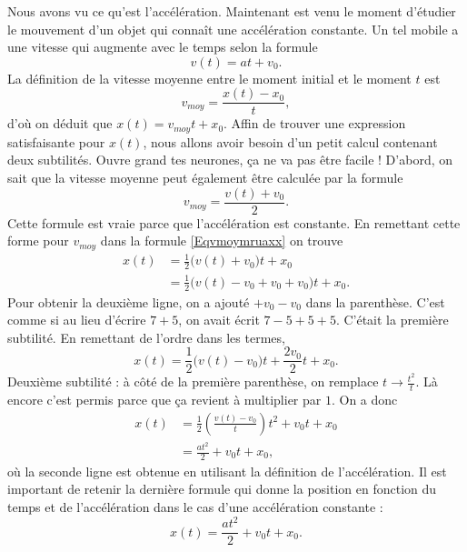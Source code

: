 \documentclass[a4paper,12pt]{book}
\theoremstyle{mes_exemples}	\newtheorem{exemple}[numtho]{Exemple}
\theoremstyle{mes_tho}
\begin{document}
Nous avons vu ce qu'est l'accélération. Maintenant est venu le moment d'étudier le mouvement d'un objet qui connaît une accélération constante. Un tel mobile a une vitesse qui augmente avec le temps selon la formule
\[ 
  v(t)=at+v_0.
\]
La définition de la vitesse moyenne entre le moment initial et le moment $t$ est 
\begin{equation}		\label{Eqvmoymruaxx}
v_{moy}=\frac{ x(t)-x_0 }{ t },
\end{equation}
d'où on déduit que $x(t)=v_{moy}t+x_0$. Affin de trouver une expression satisfaisante pour $x(t)$, nous allons avoir besoin d'un petit calcul contenant deux subtilités. Ouvre grand tes neurones, ça ne va pas être facile ! D'abord, on sait que la vitesse moyenne peut également être calculée par la formule
\[ 
  v_{moy}=\frac{ v(t)+v_0 }{ 2 }.
\]
Cette formule est vraie parce que l'accélération est constante. En remettant cette forme pour $v_{moy}$ dans la formule \eqref{Eqvmoymruaxx} on trouve
 \begin{equation}
\begin{split}
  x(t)&=\frac{ 1 }{2}\big( v(t)+v_0 \big)t+x_0\\
	&=\frac{ 1 }{2}\big( v(t)-v_0+v_0+v_0 \big)t+x_0.
\end{split}
\end{equation}
Pour obtenir la deuxième ligne, on a ajouté $+v_0-v_0$ dans la parenthèse. C'est comme si au lieu d'écrire $7+5$, on avait écrit $7-5+5+5$. C'était la première subtilité. En remettant de l'ordre dans les termes,
\[ 
  x(t)=\frac{ 1 }{2}\big( v(t)-v_0 \big)t+\frac{ 2v_0 }{ 2 }t+x_0.
\]
Deuxième subtilité : à côté de la première parenthèse, on remplace $t\to \frac{ t^2 }{ t }$. Là encore c'est permis parce que ça revient à multiplier par $1$. On a donc
\[ 
\begin{split}
  x(t)&=\frac{ 1 }{2}\left( \frac{ v(t)-v_0 }{ t } \right) t^2+v_0t+x_0\\
	&=\frac{ at^2 }{ 2 }+v_0t+x_0,
\end{split}
\]
où la seconde ligne est obtenue en utilisant la définition de l'accélération. Il est important de retenir la dernière formule qui donne la position en fonction du temps et de l'accélération dans le cas d'une accélération constante :
\begin{equation}			\label{EqMouvAccatc}
x(t)=\frac{ at^2 }{ 2 }+v_0t+x_0.
\end{equation}
\end{document}
